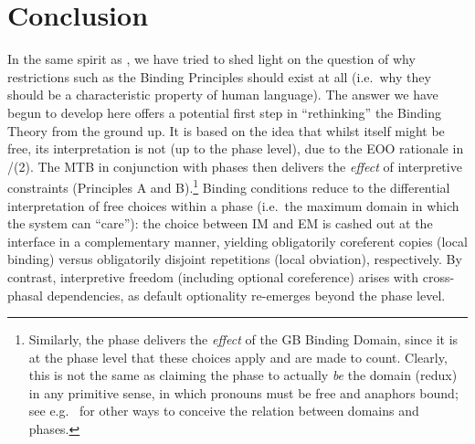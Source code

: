 \documentclass[output=paper]{langsci/langscibook}
\begin{document}
\section{Conclusion}

In the same spirit as \textcite{Hornstein2009,Hornstein2013}, we have tried to
shed light on the question of why restrictions such as the Binding
Principles should exist at all (i.e.\ why they should be a
characteristic property of human language). The answer we have begun to develop
here offers a potential first step in \enquote{rethinking} the Binding Theory
from the ground up. It is based on the idea that whilst  itself
might be free, its interpretation is not (up to the phase level),
due to the \gls{EOO} rationale in /(2).  The \gls{MTB} in
conjunction with phases then delivers the \emph{effect} of interpretive
constraints (Principles A and B).\footnote{Similarly, the phase
    delivers the \emph{effect} of the \gls{GB} Binding Domain, since it is at
    the phase level that these choices apply and are made to count.
    Clearly, this is not the same as claiming the phase to actually
    \emph{be} the  domain (redux) in any primitive sense, in which
    pronouns must be free and anaphors bound; see e.g.\
    \citealt{UriGal2006,Hicks2009,Sabel2012} for other ways to conceive the
relation between \isi{binding} domains and phases.} Binding conditions reduce
to the differential interpretation of free \isi{Merge} choices within a
phase\is{phases} (i.e.\ the maximum domain in which the system can
\enquote{care}): the choice between \gls{IM} and \gls{EM}\is{Merge}
is cashed out at the interface in a complementary manner, yielding obligatorily
coreferent copies (local binding) versus obligatorily disjoint repetitions
(local obviation), respectively. By contrast, interpretive freedom (including
optional coreference) arises with cross-phasal\is{phases} dependencies, as default
optionality re-emerges beyond the phase level.
\end{document}
